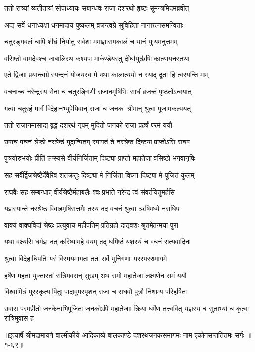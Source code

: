 
\twolineshloka
{ततो रात्र्यां व्यतीतायां सोपाध्यायः सबान्धवः}
{राजा दशरथो हृष्टः सुमन्त्रमिदमब्रवीत्} %

\twolineshloka
{अद्य सर्वे धनाध्यक्षा धनमादाय पुष्कलम्}
{व्रजन्त्वग्रे सुविहिता नानारत्नसमन्विताः} %

\twolineshloka
{चतुरङ्गबलं चापि शीघ्रं निर्यातु सर्वशः}
{ममाज्ञासमकालं च यानं युग्यमनुत्तमम्} %

\twolineshloka
{वसिष्ठो वामदेवश्च जाबालिरथ कश्यपः}
{मार्कण्डेयस्तु दीर्घायुर्ऋषिः कात्यायनस्तथा} %

\twolineshloka
{एते द्विजाः प्रयान्त्वग्रे स्यन्दनं योजयस्व मे}
{यथा कालात्ययो न स्याद् दूता हि त्वरयन्ति माम्} %

\twolineshloka
{वचनाच्च नरेन्द्रस्य सेना च चतुरङ्गिणी}
{राजानमृषिभिः सार्धं व्रजन्तं पृष्ठतोऽन्वयात्} %

\twolineshloka
{गत्वा चतुरहं मार्गं विदेहानभ्युपेयिवान्}
{राजा च जनकः श्रीमान् श्रुत्वा पूजामकल्पयत्} %

\twolineshloka
{ततो राजानमासाद्य वृद्धं दशरथं नृपम्}
{मुदितो जनको राजा प्रहर्षं परमं ययौ} %

\twolineshloka
{उवाच वचनं श्रेष्ठो नरश्रेष्ठं मुदान्वितम्}
{स्वागतं ते नरश्रेष्ठ दिष्ट्या प्राप्तोऽसि राघव} %

\twolineshloka
{पुत्रयोरुभयोः प्रीतिं लप्स्यसे वीर्यनिर्जिताम्}
{दिष्ट्या प्राप्तो महातेजा वसिष्ठो भगवानृषिः} %

\twolineshloka
{सह सर्वैर्द्विजश्रेष्ठैर्देवैरिव शतक्रतुः}
{दिष्ट्या मे निर्जिता विघ्ना दिष्ट्या मे पूजितं कुलम्} %

\twolineshloka
{राघवैः सह सम्बन्धाद् वीर्यश्रेष्ठैर्महाबलैः}
{श्वः प्रभाते नरेन्द्र त्वं संवर्तयितुमर्हसि} %

\twolineshloka
{यज्ञस्यान्ते नरश्रेष्ठ विवाहमृषिसत्तमैः}
{तस्य तद् वचनं श्रुत्वा ऋषिमध्ये नराधिपः} %

\twolineshloka
{वाक्यं वाक्यविदां श्रेष्ठः प्रत्युवाच महीपतिम्}
{प्रतिग्रहो दातृवशः श्रुतमेतन्मया पुरा} %

\twolineshloka
{यथा वक्ष्यसि धर्मज्ञ तत् करिष्यामहे वयम्}
{तद् धर्मिष्ठं यशस्यं च वचनं सत्यवादिनः} %

\twolineshloka
{श्रुत्वा विदेहाधिपतिः परं विस्मयमागतः}
{ततः सर्वे मुनिगणाः परस्परसमागमे} %

\twolineshloka
{हर्षेण महता युक्तास्तां रात्रिमवसन् सुखम्}
{अथ रामो महातेजा लक्ष्मणेन समं ययौ} %

\twolineshloka
{विश्वामित्रं पुरस्कृत्य पितुः पादावुपस्पृशन्}
{राजा च राघवौ पुत्रौ निशाम्य परिहर्षितः} %

\threelineshloka
{उवास परमप्रीतो जनकेनाभिपूजितः}
{जनकोऽपि महातेजाः क्रिया धर्मेण तत्त्ववित्}
{यज्ञस्य च सुताभ्यां च कृत्वा रात्रिमुवास ह} %


॥इत्यार्षे श्रीमद्रामायणे वाल्मीकीये आदिकाव्ये बालकाण्डे दशरथजनकसमागमः नाम एकोनसप्ततितमः सर्गः ॥१-६९॥

